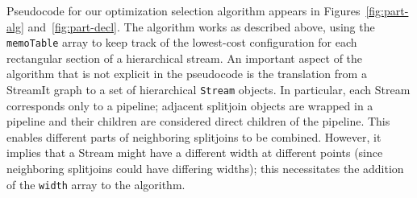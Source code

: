 Pseudocode for our optimization selection algorithm appears in
Figures~\ref{fig:part-alg} and~\ref{fig:part-decl}.  The algorithm
works as described above, using the {\tt memoTable} array to keep
track of the lowest-cost configuration for each rectangular section of
a hierarchical stream.  An important aspect of the algorithm that is
not explicit in the pseudocode is the translation from a StreamIt
graph to a set of hierarchical {\tt Stream} objects.  In particular,
each Stream corresponds only to a pipeline; adjacent 
splitjoin objects are wrapped in a pipeline and their children
are considered direct children of the pipeline. This enables
different parts of neighboring splitjoins to be combined.
However, it implies that a Stream might have a different width
at different points (since neighboring splitjoins could have
differing widths); this necessitates the addition of the {\tt width}
array to the algorithm.

